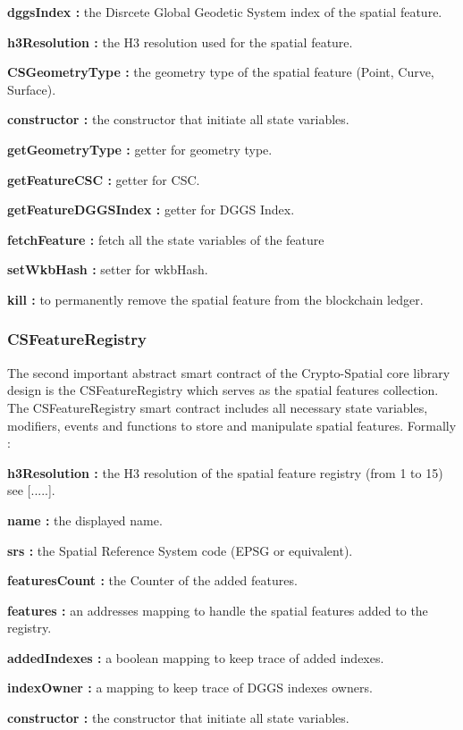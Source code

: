 \documentclass{isprs} %
\begin{document}
\textbf{dggsIndex :} the Disrcete Global Geodetic System index of the spatial feature.

\textbf{h3Resolution :} the H3 resolution used for the spatial feature.

\textbf{CSGeometryType :} the geometry type of the spatial feature (Point, Curve, Surface).

\textbf{constructor :} the constructor that initiate all state variables.

\textbf{getGeometryType :} getter for geometry type.

\textbf{getFeatureCSC :} getter for CSC.

\textbf{getFeatureDGGSIndex :} getter for DGGS Index.

\textbf{fetchFeature :} fetch all the state variables of the feature

\textbf{setWkbHash :} setter for wkbHash.

\textbf{kill :} to permanently remove the spatial feature from the blockchain ledger.

\subsubsection{CSFeatureRegistry}\label{sec:CSFeatureRegistry}

The second important abstract smart contract of the Crypto-Spatial core library design is the CSFeatureRegistry which serves as the spatial features collection. 
The CSFeatureRegistry smart contract includes all necessary state variables, modifiers, events and functions to store and manipulate spatial features. Formally :

\textbf{h3Resolution :} the H3 resolution of the spatial feature registry (from 1 to 15) see [.....].

\textbf{name :} the displayed name.

\textbf{srs :} the Spatial Reference System code (EPSG or equivalent).

\textbf{featuresCount :} the Counter of the added features.

\textbf{features :} an addresses mapping to handle the spatial features added to the registry.

\textbf{addedIndexes :} a boolean mapping to keep trace of added indexes.

\textbf{indexOwner :} a mapping to keep trace of DGGS indexes owners.

\textbf{constructor :} the constructor that initiate all state variables.
\end{document}
